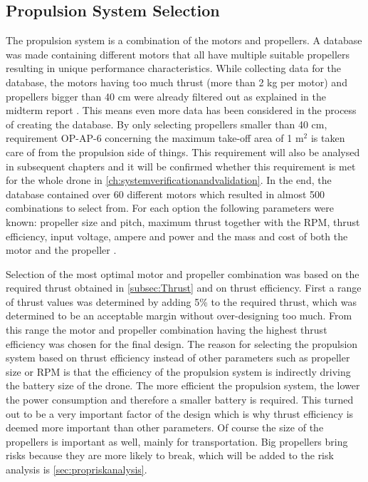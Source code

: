 \subsection{Propulsion System Selection}
\label{subsec:propselection}
The propulsion system is a combination of the motors and propellers. A database was made containing different motors that all have multiple suitable propellers resulting in unique performance characteristics. While collecting data for the database, the motors having too much thrust (more than 2 kg per motor) and propellers bigger than 40 cm were already filtered out as explained in the midterm report \cite{midterm}. This means even more data has been considered in the process of creating the database. By only selecting propellers smaller than 40 cm, requirement OP-AP-6 concerning the maximum take-off area of 1 m$^2$ is taken care of from the propulsion side of things. This requirement will also be analysed in subsequent chapters and it will be confirmed whether this requirement is met for the whole drone in \autoref{ch:systemverificationandvalidation}. In the end, the database contained over 60 different motors which resulted in almost 500 combinations to select from. For each option the following parameters were known: propeller size and pitch, maximum thrust together with the RPM, thrust efficiency, input voltage, ampere and power and the mass and cost of both the motor and the propeller \cite{propdatabase1} \cite{propdatabase2} \cite{propdatabase3} \cite{propdatabase4}.

Selection of the most optimal motor and propeller combination was based on the required thrust obtained in \autoref{subsec:Thrust} and on thrust efficiency. First a range of thrust values was determined by adding 5\% to the required thrust, which was determined to be an acceptable margin without over-designing too much. From this range the motor and propeller combination having the highest thrust efficiency was chosen for the final design. The reason for selecting the propulsion system based on thrust efficiency instead of other parameters such as propeller size or RPM is that the efficiency of the propulsion system is indirectly driving the battery size of the drone. The more efficient the propulsion system, the lower the power consumption and therefore a smaller battery is required. This turned out to be a very important factor of the design which is why thrust efficiency is deemed more important than other parameters. Of course the size of the propellers is important as well, mainly for transportation. Big propellers bring risks because they are more likely to break, which will be added to the risk analysis is \autoref{sec:propriskanalysis}.

